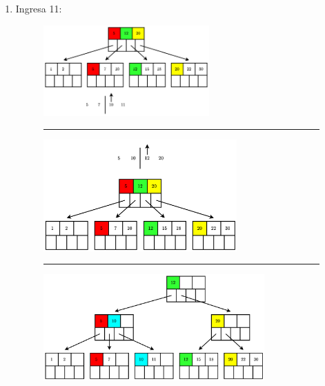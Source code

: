 \documentclass{templateNote}
\begin{document}
\begin{itemize}
\begin{enumerate}
\begin{enumerate}
\begin{enumerate}
                \newpage
                \item Ingresa 11:
                \begin{figure}[H]
                    \centering
                    \includegraphics[width=0.6\textwidth]{diagram/P3-1-12-1.png}
                    \rule{\textwidth}{1pt}
                    \includegraphics[width=0.7\textwidth]{diagram/P3-1-12-2.png}
                    \rule{\textwidth}{1pt}
                    \includegraphics[width=0.8\textwidth]{diagram/P3-1-12-3.png}
                \end{figure}


\end{enumerate}
\end{enumerate}
\end{enumerate}
\end{itemize}
\end{document}
